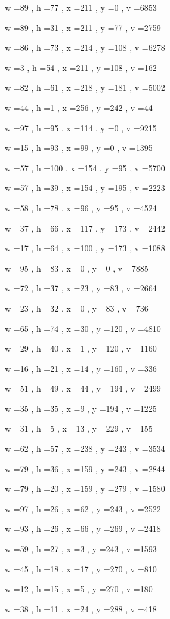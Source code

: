 \documentclass[11pt]{article}
\begin{document}
w =89 , h =77 , x =211 , y =0 , v =6853
\par
w =89 , h =31 , x =211 , y =77 , v =2759
\par
w =86 , h =73 , x =214 , y =108 , v =6278
\par
w =3 , h =54 , x =211 , y =108 , v =162
\par
w =82 , h =61 , x =218 , y =181 , v =5002
\par
w =44 , h =1 , x =256 , y =242 , v =44
\par
w =97 , h =95 , x =114 , y =0 , v =9215
\par
w =15 , h =93 , x =99 , y =0 , v =1395
\par
w =57 , h =100 , x =154 , y =95 , v =5700
\par
w =57 , h =39 , x =154 , y =195 , v =2223
\par
w =58 , h =78 , x =96 , y =95 , v =4524
\par
w =37 , h =66 , x =117 , y =173 , v =2442
\par
w =17 , h =64 , x =100 , y =173 , v =1088
\par
w =95 , h =83 , x =0 , y =0 , v =7885
\par
w =72 , h =37 , x =23 , y =83 , v =2664
\par
w =23 , h =32 , x =0 , y =83 , v =736
\par
w =65 , h =74 , x =30 , y =120 , v =4810
\par
w =29 , h =40 , x =1 , y =120 , v =1160
\par
w =16 , h =21 , x =14 , y =160 , v =336
\par
w =51 , h =49 , x =44 , y =194 , v =2499
\par
w =35 , h =35 , x =9 , y =194 , v =1225
\par
w =31 , h =5 , x =13 , y =229 , v =155
\par
w =62 , h =57 , x =238 , y =243 , v =3534
\par
w =79 , h =36 , x =159 , y =243 , v =2844
\par
w =79 , h =20 , x =159 , y =279 , v =1580
\par
w =97 , h =26 , x =62 , y =243 , v =2522
\par
w =93 , h =26 , x =66 , y =269 , v =2418
\par
w =59 , h =27 , x =3 , y =243 , v =1593
\par
w =45 , h =18 , x =17 , y =270 , v =810
\par
w =12 , h =15 , x =5 , y =270 , v =180
\par
w =38 , h =11 , x =24 , y =288 , v =418
\par
\newpage
\end{document}
